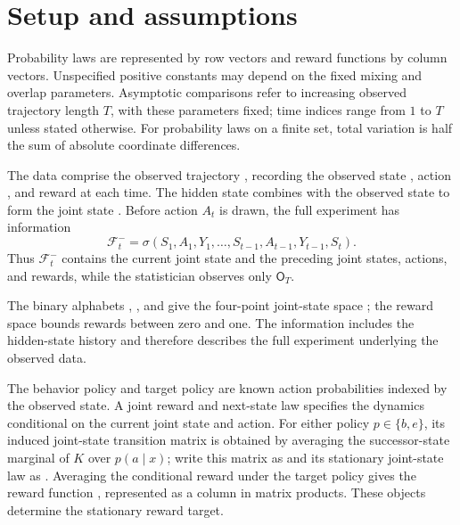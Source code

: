 \section{Setup and assumptions}

Probability laws are represented by row vectors and reward functions by column vectors. Unspecified positive constants may depend on the fixed mixing and overlap parameters. Asymptotic comparisons refer to increasing observed trajectory length \(T\), with these parameters fixed; time indices range from \(1\) to \(T\) unless stated otherwise. For probability laws on a finite set, total variation is half the sum of absolute coordinate differences.

The data comprise the observed trajectory , recording the observed state , action , and reward  at each time. The hidden state  combines with the observed state to form the joint state . Before action \(A_t\) is drawn, the full experiment has information
\[
\mathcal F_t^-=\sigma(S_1,A_1,Y_1,\ldots,S_{t-1},A_{t-1},Y_{t-1},S_t).
\]
Thus \(\mathcal F_t^-\) contains the current joint state and the preceding joint states, actions, and rewards, while the statistician observes only \(\mathsf O_T\).

The binary alphabets , , and  give the four-point joint-state space ; the reward space  bounds rewards between zero and one. The information  includes the hidden-state history and therefore describes the full experiment underlying the observed data.

The behavior policy  and target policy  are known action probabilities indexed by the observed state. A joint reward and next-state law  specifies the dynamics conditional on the current joint state and action. For either policy \(p\in\{b,e\}\), its induced joint-state transition matrix is obtained by averaging the successor-state marginal of \(K\) over \(p(a\mid x)\); write this matrix as  and its stationary joint-state law as . Averaging the conditional reward under the target policy gives the reward function , represented as a column in matrix products. These objects determine the stationary reward target.



